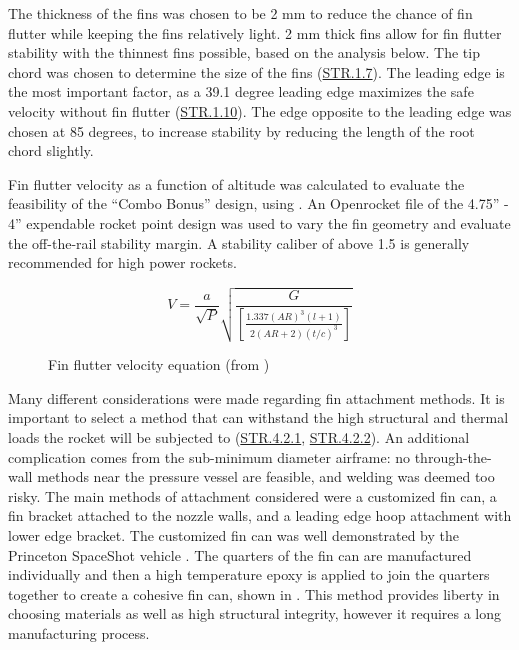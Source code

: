 The thickness of the fins was chosen to be 2 mm to reduce the chance of fin flutter while keeping the fins relatively light. 2 mm thick fins allow for fin flutter stability with the thinnest fins possible, based on the analysis below. The tip chord was chosen to determine the size of the fins (\hyperlink{STR.1.7}{STR.1.7}). The leading edge is the most important factor, as a 39.1 degree leading edge maximizes the safe velocity without fin flutter \cite{lf2} (\hyperlink{STR.1.10}{STR.1.10}). The edge opposite to the leading edge was chosen at 85 degrees, to increase stability by reducing the length of the root chord slightly. 

Fin flutter velocity as a function of altitude was calculated to evaluate the feasibility of the ``Combo Bonus'' design, using . An Openrocket file of the 4.75'' - 4'' expendable rocket point design was used to vary the fin geometry and evaluate the off-the-rail stability margin. A stability caliber of above 1.5 is generally recommended for high power rockets.

\begin{figure}
    \begin{equation} \label{equation:fin-flutter}
        V = \frac{a}{\sqrt{P}} \sqrt{\frac{G}{\left[\frac{1.337 (AR)^3 (l + 1)}{2 (AR + 2) \left(t/c\right)^3}\right]}}
    \end{equation}
    \caption*{Fin flutter velocity equation (from \cite{lf1})}
\end{figure}

Many different considerations were made regarding fin attachment methods. It is important to select a method that can withstand the high structural and thermal loads the rocket will be subjected to (\hyperlink{STR.4.2.1}{STR.4.2.1}, \hyperlink{STR.4.2.2}{STR.4.2.2}). An additional complication comes from the sub-minimum diameter airframe: no through-the-wall methods near the pressure vessel are feasible, and welding was deemed too risky. The main methods of attachment considered were a customized fin can, a fin bracket attached to the nozzle walls, and a leading edge hoop attachment with lower edge bracket. The customized fin can was well demonstrated by the Princeton SpaceShot vehicle \cite{princeton}. The quarters of the fin can are manufactured individually and then a high temperature epoxy is applied to join the quarters together to create a cohesive fin can, shown in . This method provides liberty in choosing materials as well as high structural integrity, however it requires a long manufacturing process.

